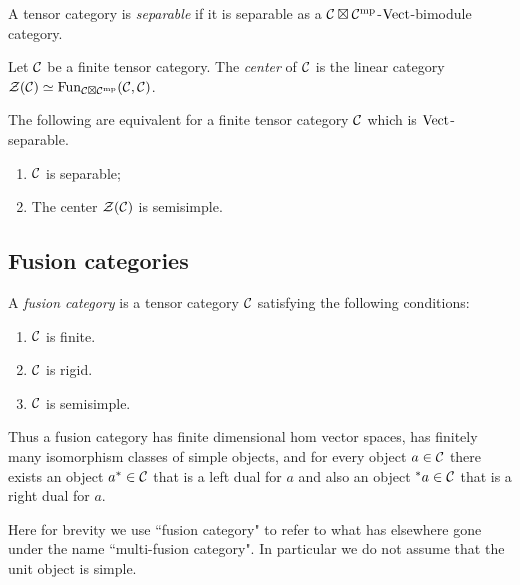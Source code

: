 \documentclass{amsart}
\begin{document}
\begin{definition}
	A tensor category is {\em separable} if it is separable as a $\mathcal C \boxtimes \mathcal C^{\mathrm{mp}}$-$\mathrm{Vect}$-bimodule category.  
\end{definition}

\begin{definition}
	Let $\mathcal C$ be a finite tensor category. The {\em center} of $\mathcal C$ is the linear category $\mathcal Z(\mathcal C) \simeq \operatorname{Fun}_{\mathcal C \boxtimes \mathcal C^{\mathrm{mp}}}(\mathcal C, \mathcal C)$.
\end{definition}

\begin{corollary}
	The following are equivalent for a finite tensor category $\mathcal C$ which is $\mathrm{Vect}$-separable.
	\begin{enumerate}
		\item $\mathcal C$ is separable;
		\item The center $\mathcal Z(\mathcal C)$ is semisimple.
	\end{enumerate} 
\end{corollary}




\subsection{Fusion categories} \label{sec-tc-fusion}

\begin{definition}
A \emph{fusion category} is a tensor category $\mathcal C$ satisfying the following conditions:
\begin{enumerate}
\item $\mathcal C$ is finite.
\item $\mathcal C$ is rigid. 
\item $\mathcal C$ is semisimple. 
\end{enumerate}
\end{definition}

Thus a fusion category has finite dimensional hom vector spaces, has finitely many isomorphism classes of simple objects, and for every object $a \in \mathcal C$ there exists an object ${a^*} \in \mathcal C$ that is a left dual for $a$ and also an object ${}^{*}a \in \mathcal C$ that is a right dual for $a$.

\begin{warning}
Here for brevity we use ``fusion category" to refer to what has elsewhere gone under the name ``multi-fusion category". In particular we do not assume that the unit object is simple.
\end{warning}
\end{document}
